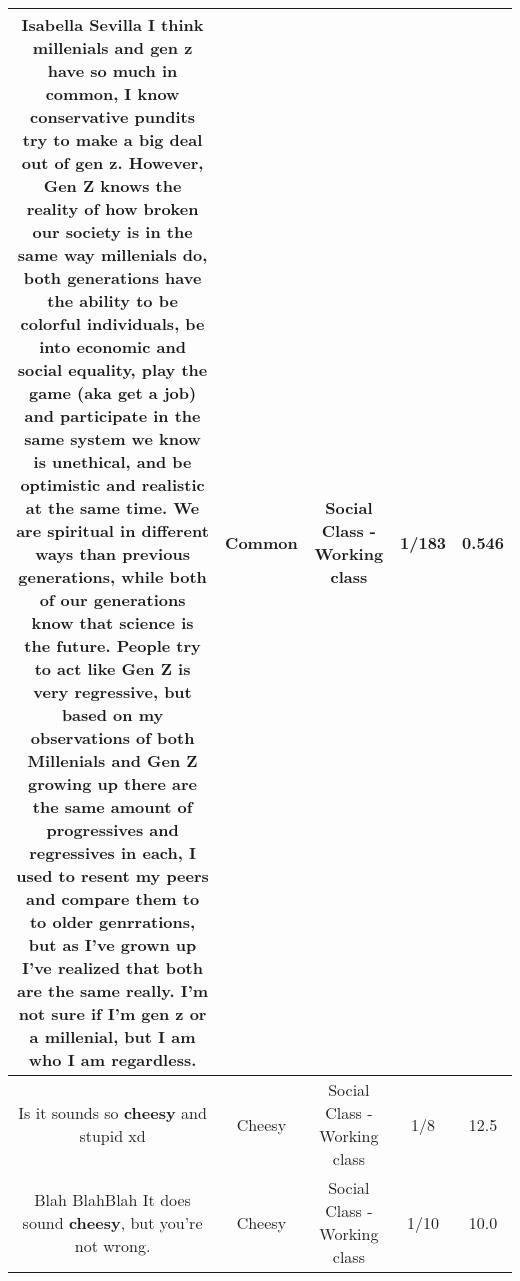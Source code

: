 \documentclass[11pt]{article}
\newlength\mylength
\begin{document}
\begin{center}
\begin{longtable}{|C{.65\mylength}|C{.30\mylength}|C{.12\mylength}|C{.12\mylength}|C{.12\mylength}|}
  \small Isabella Sevilla I think millenials and gen z have so much in \textbf{common}, I know conservative pundits try to make a big deal out of gen z. However, Gen Z knows the reality of how broken our society is in the same way millenials do, both generations have the ability to be colorful individuals, be into economic and social equality, play the game (aka get a job) and participate in the same system we know is unethical, and be optimistic and realistic at the same time. We are spiritual in different ways than previous generations, while both of our generations know that science is the future. People try to act like Gen Z is very regressive, but based on my observations of both Millenials and Gen Z growing up there are the same amount of progressives and regressives in each, I used to resent my peers and compare them to to older genrrations, but as I've grown up I've realized that both are the same really. I'm not sure if I'm gen z or a millenial, but I am who I am regardless.\normalsize   & Common & Social Class - Working class & 1/183 & 0.546 \\  \hline
  \small Is it sounds so \textbf{cheesy} and stupid xd\normalsize   & Cheesy & Social Class - Working class & 1/8 & 12.5 \\  \hline
  \small Blah BlahBlah It does sound \textbf{cheesy}, but you're not wrong.\normalsize   & Cheesy & Social Class - Working class & 1/10 & 10.0 \\  \hline

\end{longtable}
\end{center}
\end{document}
